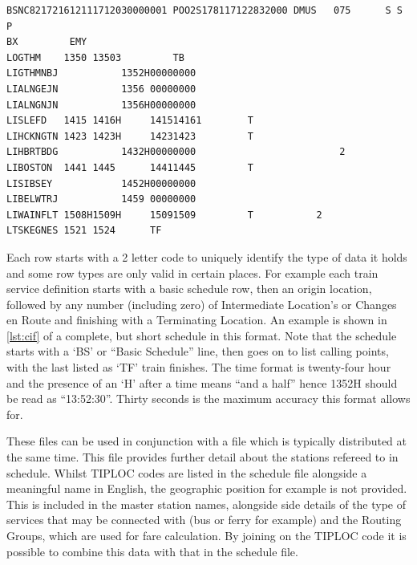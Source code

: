 \begin{minipage}{\textwidth}%
\begin{lstlisting}[label={lst:cif}, caption={CIF file example}]
BSNC821721612111712030000001 POO2S178117122832000 DMUS   075      S S          P
BX         EMY                                                                  
LOGTHM    1350 13503         TB                                                 
LIGTHMNBJ           1352H00000000                                               
LIALNGEJN           1356 00000000                                               
LIALNGNJN           1356H00000000                                               
LISLEFD   1415 1416H     141514161        T                                     
LIHCKNGTN 1423 1423H     14231423         T                                     
LIHBRTBDG           1432H00000000                         2                     
LIBOSTON  1441 1445      14411445         T                                     
LISIBSEY            1452H00000000                                               
LIBELWTRJ           1459 00000000                                               
LIWAINFLT 1508H1509H     15091509         T           2                         
LTSKEGNES 1521 1524      TF                                                     

\end{lstlisting}
\end{minipage}

Each row starts with a 2 letter code to uniquely identify the type of data it holds and some row types are only valid in certain places. For example each train service definition starts with a basic schedule row, then an origin location, followed by any number (including zero) of Intermediate Location's or Changes en Route and finishing with a Terminating Location. An example is shown in \autoref{lst:cif} of a complete, but short schedule in this format. Note that the schedule starts with a `BS' or ``Basic Schedule'' line, then goes on to list calling points, with the last listed as  `TF' train finishes. The time format is twenty-four hour and the presence of an `H' after a time means ``and a half'' hence 1352H should be read as ``13:52:30''. Thirty seconds is the maximum accuracy this format allows for. 

These files can be used in conjunction with a  file which is typically distributed at the same time. This file provides further detail about the stations refereed to in schedule. Whilst TIPLOC codes are listed in the schedule file alongside a meaningful name in English, the geographic position for example is not provided. This is included in the master station names, alongside side details of the type of services that may be connected with (bus or ferry for example) and the Routing Groups, which are used for fare calculation. By joining on the TIPLOC code it is possible to combine this data with that in the schedule file.

